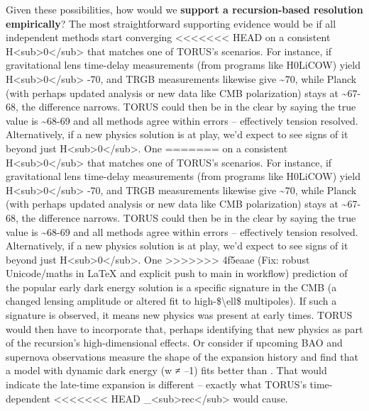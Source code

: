 \documentclass[]{article}
\begin{document}
Given these possibilities, how would we \textbf{support a
recursion-based resolution empirically}? The most straightforward
supporting evidence would be if all independent methods start converging
<<<<<<< HEAD
on a consistent H\textless sub\textgreater0\textless/sub\textgreater{}
that matches one of TORUS's scenarios. For instance, if gravitational
lens time-delay measurements (from programs like H0LiCOW) yield
H\textless sub\textgreater0\textless/sub\textgreater{} -70, and TRGB
measurements likewise give \textasciitilde70, while Planck (with perhaps
updated analysis or new data like CMB polarization) stays at
\textasciitilde67-68, the difference narrows. TORUS could then be in the
clear by saying the true value is \textasciitilde68-69 and all methods
agree within errors -- effectively tension resolved. Alternatively, if a
new physics solution is at play, we'd expect to see signs of it beyond
just H\textless sub\textgreater0\textless/sub\textgreater. One
=======
on a consistent
H\textless{}sub\textgreater{}0\textless{}/sub\textgreater{} that matches
one of TORUS's scenarios. For instance, if gravitational lens time-delay
measurements (from programs like H0LiCOW) yield
H\textless{}sub\textgreater{}0\textless{}/sub\textgreater{} -70, and
TRGB measurements likewise give \textasciitilde{}70, while Planck (with
perhaps updated analysis or new data like CMB polarization) stays at
\textasciitilde{}67-68, the difference narrows. TORUS could then be in
the clear by saying the true value is \textasciitilde{}68-69 and all
methods agree within errors -- effectively tension resolved.
Alternatively, if a new physics solution is at play, we'd expect to see
signs of it beyond just
H\textless{}sub\textgreater{}0\textless{}/sub\textgreater{}. One
>>>>>>> 4f5eaae (Fix: robust Unicode/maths in LaTeX and explicit push to main in workflow)
prediction of the popular early dark energy solution is a specific
signature in the CMB (a changed lensing amplitude or altered fit to
high-\$\textbackslash{}ell\$ multipoles). If such a signature is
observed, it means new physics was present at early times. TORUS would
then have to incorporate that, perhaps identifying that new physics as
part of the recursion's high-dimensional effects. Or consider if
upcoming BAO and supernova observations measure the shape of the
expansion history and find that a model with dynamic dark energy (w ≠
--1) fits better than . That would indicate the late-time expansion
is different -- exactly what TORUS's time-dependent
<<<<<<< HEAD
\Lambda\_\textless sub\textgreater rec\textless/sub\textgreater{} would cause.
\end{document}
